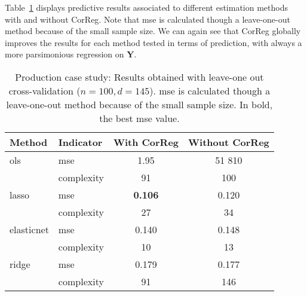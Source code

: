 \documentclass[11pt,a4paper]{article}
\begin{document}

Table~\ref{Res_prod} displays predictive results associated to different estimation methods with and without {\sc CorReg}. Note that {\sc mse} is calculated though a leave-one-out method because of the small sample size. We can again see that {\sc CorReg} globally improves the results for each method tested in terms of prediction, with always a more parsimonious regression on $\boldsymbol{Y}$.
		

\begin{table}[h!]
\centering
\begin{tabular}{llcc}
	\hline 
	Method& Indicator& With {\sc CorReg} & Without {\sc CorReg} \\ 
	\hline\hline
	{\sc ols} &  {\sc mse}& 1.95& 51 810\\
		& complexity & 91& 100 \\
	\hline 
		{\sc lasso} & {\sc mse} & {\bf 0.106} & 0.120\\
		& complexity & 27&34\\
	\hline 
		elasticnet & {\sc mse} &0.140 &0.148\\
		& complexity &10 &13\\
	\hline 
		ridge & {\sc mse} & 0.179 & 0.177\\
		& complexity &91 &146\\
	\hline 
\end{tabular} 
\caption{Production case study: Results obtained with leave-one out cross-validation ($n=100, d=145$). {\sc mse} is calculated though a leave-one-out method because of the small sample size. In bold, the best {\sc mse} value.}	\label{Res_prod}
\end{table}



\FloatBarrier
\end{document}
